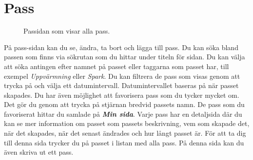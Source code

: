 \documentclass{article}
\newcommand{\term}[1]{\textcolor{secondary}{\textit{\textbf{#1}}}}
\newcommand*{\img}[1]{%
    \raisebox{-.3\baselineskip}{%
        \texttt{[image: \#1]}%
    }%
}
\begin{document}
{\newpage   
\section{Pass}
    \begin{figure}
        \vspace{15pt}
        \caption{Passidan som visar alla pass.}
        \label{fig:workouts}
        \vspace{-40pt}
    \end{figure}
    På pass-sidan kan du se, ändra, ta bort och lägga till pass. Du kan söka bland passen som finns via sökrutan som du hittar under titeln för sidan. Du kan välja att söka antingen efter namnet på passet eller taggarna som passet har, till exempel \textit{Uppvärmning} eller \textit{Spark}. Du kan filtrera de pass som visas genom att trycka på \img{images/icons ref/Filter.png} och välja ett datumintervall. Datumintervallet baseras på när passet skapades. Du har även möjlighet att favorisera pass som du tycker mycket om. Det gör du genom att trycka på stjärnan \img{images/icons ref/star.png} bredvid passets namn. De pass som du favoriserat hittar du samlade på \term{Min sida}. Varje pass har en detaljsida där du kan se mer information om passet som passets beskrivning, vem som skapade det, när det skapades, när det senast ändrades och hur långt passet är. För att ta dig till denna sida trycker du på passet i listan med alla pass. På denna sida kan du även skriva ut ett pass.

}
\end{document}
